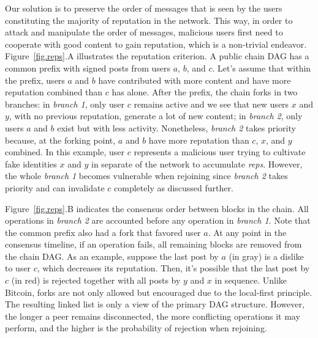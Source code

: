 \documentclass[10pt,journal,compsoc]{IEEEtran}
\newcommand{\reps}     {\emph{reps}\xspace}
\begin{document}
Our solution is to preserve the order of messages that is seen by the users
constituting the majority of reputation in the network.
This way, in order to attack and manipulate the order of messages, malicious
users first need to cooperate with good content to gain reputation, which is
a non-trivial endeavor.
%
Figure~\ref{fig.reps}.A illustrates the reputation criterion.
A public chain DAG has a common prefix with signed posts from users $a$, $b$,
and $c$.
Let's assume that within the prefix, users $a$ and $b$ have contributed with
more content and have more reputation combined than $c$ has alone.
%
After the prefix, the chain forks in two branches:
in \emph{branch 1}, only user $c$ remains active and we see that new users $x$
and $y$, with no previous reputation, generate a lot of new content;
in \emph{branch 2}, only users $a$ and $b$ exist but with less activity.
Nonetheless, \emph{branch 2} takes priority because, at the forking point, $a$
and $b$ have more reputation than $c$, $x$, and $y$ combined.
%
In this example, user $c$ represents a malicious user trying to cultivate fake
identities $x$ and $y$ in separate of the network to accumulate \reps.
However, the whole \emph{branch 1} becomes vulnerable when rejoining since
\emph{branch 2} takes priority and can invalidate $c$ completely as discussed
further.

Figure~\ref{fig.reps}.B indicates the consensus order between blocks in the
chain.
All operations in \emph{branch 2} are accounted before any operation in
\emph{branch 1}.
Note that the common prefix also had a fork that favored user $a$.
%
At any point in the consensus timeline, if an operation fails, all remaining
blocks are removed from the chain DAG.
As an example, suppose the last post by $a$ (in gray) is a dislike to user $c$,
which decreases its reputation.
Then, it's possible that the last post by $c$ (in red) is rejected together
with all posts by $y$ and $x$ in sequence.
%
Unlike Bitcoin, forks are not only allowed but encouraged due to the
local-first principle.
The resulting linked list is only a view of the primary DAG structure.
However, the longer a peer remains disconnected, the more conflicting
operations it may perform, and the higher is the probability of rejection when
rejoining.
\end{document}
